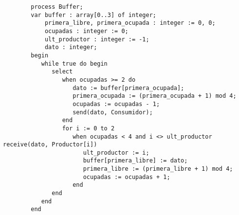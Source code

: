 \begin{ejercicio}
    \begin{verbatim}
        process Buffer;
        var buffer : array[0..3] of integer;
            primera_libre, primera_ocupada : integer := 0, 0;
            ocupadas : integer := 0;
            ult_productor : integer := -1;
            dato : integer;
        begin
           while true do begin
              select 
                 when ocupadas >= 2 do
                    dato := buffer[primera_ocupada];
                    primera_ocupada := (primera_ocupada + 1) mod 4;
                    ocupadas := ocupadas - 1;
                    send(dato, Consumidor);
                 end
                 for i := 0 to 2
                    when ocupadas < 4 and i <> ult_productor receive(dato, Productor[i])
                       ult_productor := i;
                       buffer[primera_libre] := dato;
                       primera_libre := (primera_libre + 1) mod 4;
                       ocupadas := ocupadas + 1;
                    end
              end
           end
        end
    \end{verbatim}
\end{ejercicio}

